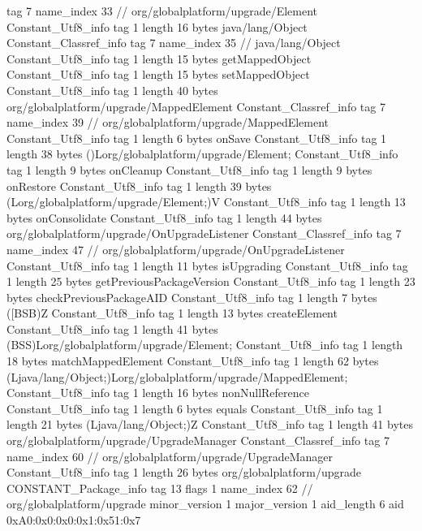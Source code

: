 {{{			tag	7
			name_index	33		// org/globalplatform/upgrade/Element
		}
		Constant_Utf8_info {
			tag	1
			length	16
			bytes	java/lang/Object
		}
		Constant_Classref_info {
			tag	7
			name_index	35		// java/lang/Object
		}
		Constant_Utf8_info {
			tag	1
			length	15
			bytes	getMappedObject
		}
		Constant_Utf8_info {
			tag	1
			length	15
			bytes	setMappedObject
		}
		Constant_Utf8_info {
			tag	1
			length	40
			bytes	org/globalplatform/upgrade/MappedElement
		}
		Constant_Classref_info {
			tag	7
			name_index	39		// org/globalplatform/upgrade/MappedElement
		}
		Constant_Utf8_info {
			tag	1
			length	6
			bytes	onSave
		}
		Constant_Utf8_info {
			tag	1
			length	38
			bytes	()Lorg/globalplatform/upgrade/Element;
		}
		Constant_Utf8_info {
			tag	1
			length	9
			bytes	onCleanup
		}
		Constant_Utf8_info {
			tag	1
			length	9
			bytes	onRestore
		}
		Constant_Utf8_info {
			tag	1
			length	39
			bytes	(Lorg/globalplatform/upgrade/Element;)V
		}
		Constant_Utf8_info {
			tag	1
			length	13
			bytes	onConsolidate
		}
		Constant_Utf8_info {
			tag	1
			length	44
			bytes	org/globalplatform/upgrade/OnUpgradeListener
		}
		Constant_Classref_info {
			tag	7
			name_index	47		// org/globalplatform/upgrade/OnUpgradeListener
		}
		Constant_Utf8_info {
			tag	1
			length	11
			bytes	isUpgrading
		}
		Constant_Utf8_info {
			tag	1
			length	25
			bytes	getPreviousPackageVersion
		}
		Constant_Utf8_info {
			tag	1
			length	23
			bytes	checkPreviousPackageAID
		}
		Constant_Utf8_info {
			tag	1
			length	7
			bytes	([BSB)Z
		}
		Constant_Utf8_info {
			tag	1
			length	13
			bytes	createElement
		}
		Constant_Utf8_info {
			tag	1
			length	41
			bytes	(BSS)Lorg/globalplatform/upgrade/Element;
		}
		Constant_Utf8_info {
			tag	1
			length	18
			bytes	matchMappedElement
		}
		Constant_Utf8_info {
			tag	1
			length	62
			bytes	(Ljava/lang/Object;)Lorg/globalplatform/upgrade/MappedElement;
		}
		Constant_Utf8_info {
			tag	1
			length	16
			bytes	nonNullReference
		}
		Constant_Utf8_info {
			tag	1
			length	6
			bytes	equals
		}
		Constant_Utf8_info {
			tag	1
			length	21
			bytes	(Ljava/lang/Object;)Z
		}
		Constant_Utf8_info {
			tag	1
			length	41
			bytes	org/globalplatform/upgrade/UpgradeManager
		}
		Constant_Classref_info {
			tag	7
			name_index	60		// org/globalplatform/upgrade/UpgradeManager
		}
		Constant_Utf8_info {
			tag	1
			length	26
			bytes	org/globalplatform/upgrade
		}
		CONSTANT_Package_info {
			tag	13
			flags	1
			name_index	62		// org/globalplatform/upgrade
			minor_version	1
			major_version	1
			aid_length	6
			aid	0xA0:0x0:0x0:0x1:0x51:0x7
}}}
